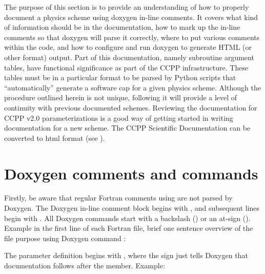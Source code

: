 \documentclass[letterpaper,10pt,english]{sphinxmanual}
\begin{document}
The purpose of this section is to provide an understanding of how to properly
document a physics scheme using doxygen in-line comments. It covers what kind of
information should be in the documentation, how to mark up the in-line comments
so that doxygen will parse it correctly, where to put various comments within
the code, and how to configure and run doxygen to generate HTML (or other format)
output. Part of this documentation, namely subroutine argument tables, have
functional significance as part of the CCPP infrastructure. These tables must be
in a particular format to be parsed by Python scripts that “automatically” generate
a software cap for a given physics scheme. Although the procedure outlined herein
is not unique, following it will provide a level of continuity with previous
documented schemes.  Reviewing the documentation for CCPP v2.0 parameterizations
is a good way of getting started in writing documentation for a new scheme. The
CCPP Scientific Documentation can be converted to html format
(see ).


\section{Doxygen comments and commands}
\label{\detokenize{ScientificDocRules:doxygen-comments-and-commands}}
Firstly, be aware that regular Fortran comments using  are not parsed
by Doxygen. The Doxygen in-line comment block begins with , and
subsequent lines begin with . All Doxygen commands start with a backslash
() or an at-sign (). Example in the first line of each Fortran file,
brief one sentence overview of the file purpose using Doxygen command :

\begin{sphinxVerbatim}[commandchars=\\\{\}]
\end{sphinxVerbatim}

The parameter definition begins with , where the sign  just tells
Doxygen that documentation follows after the member. Example:
\end{document}
